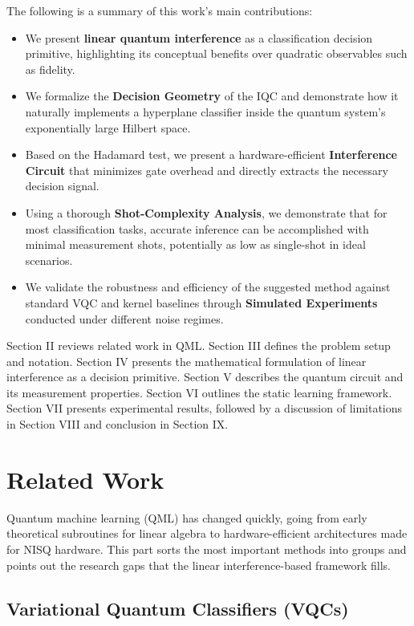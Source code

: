 \documentclass[conference]{IEEEtran}
\begin{document}
The following is a summary of this work's main contributions:
\begin{itemize}
    \item We present \textbf{linear quantum interference} as a classification decision primitive, highlighting its conceptual benefits over quadratic observables such as fidelity.
    \item We formalize the \textbf{Decision Geometry} of the IQC and demonstrate how it naturally implements a hyperplane classifier inside the quantum system's exponentially large Hilbert space.
    \item Based on the Hadamard test, we present a hardware-efficient \textbf{Interference Circuit} that minimizes gate overhead and directly extracts the necessary decision signal.
    \item Using a thorough \textbf{Shot-Complexity Analysis}, we demonstrate that for most classification tasks, accurate inference can be accomplished with minimal measurement shots, potentially as low as single-shot in ideal scenarios.
    \item We validate the robustness and efficiency of the suggested method against standard VQC and kernel baselines through \textbf{Simulated Experiments} conducted under different noise regimes.
\end{itemize}


Section II reviews related work in QML. Section III defines the problem setup and notation. Section IV presents the mathematical formulation of linear interference as a decision primitive. Section V describes the quantum circuit and its measurement properties. Section VI outlines the static learning framework. Section VII presents experimental results, followed by a discussion of limitations in Section VIII and conclusion in Section IX.

\section{Related Work}

Quantum machine learning (QML) has changed quickly, going from early theoretical subroutines for linear algebra to hardware-efficient architectures made for NISQ hardware. This part sorts the most important methods into groups and points out the research gaps that the linear interference-based framework fills.

\subsection{Variational Quantum Classifiers (VQCs)}
\end{document}

